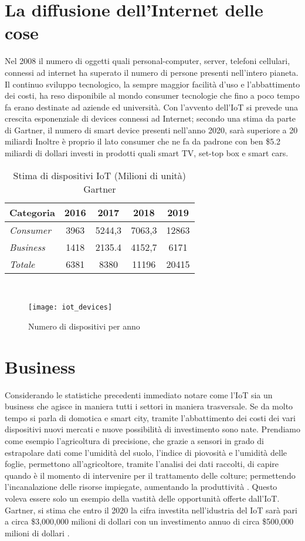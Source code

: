 \section{La diffusione dell'Internet delle cose}
Nel 2008 il numero di oggetti quali personal-computer, server, telefoni cellulari,
connessi ad internet ha superato il numero di persone presenti nell'intero
pianeta. Il continuo sviluppo tecnologico, la sempre maggior facilità d'uso e
l'abbattimento dei costi, ha reso disponibile al mondo consumer tecnologie che
fino a poco tempo fa erano destinate ad aziende ed università. 
Con l'avvento dell'IoT si prevede una crescita esponenziale di devices connessi
ad Internet;  secondo  una stima da parte di Gartner, il numero di smart
device presenti nell'anno 2020, sarà superiore a 20 miliardi \cite{gartner2016}
Inoltre è proprio il lato consumer che ne fa da padrone con ben \$5.2 miliardi
di dollari investi in prodotti quali smart TV, set-top box e smart cars.
\\
\begin{table}[h]
        \centering
        \begin{tabular}{l|c|c|c|c}
                \textbf{Categoria}  & 2016 & 2017 & 2018 & 2019 \\
                \hline
                \emph{Consumer}  & 3963 & 5244,3 & 7063,3 & 12863 \\
                \emph{Business}  & 1418 & 2135.4 & 4152,7 & 6171  \\
                \emph{Totale }   & 6381 & 8380   & 11196  & 20415 \\
        \end{tabular}
        \caption{Stima di dispositivi IoT (Milioni di unità)
        Gartner\cite{gartner2016}}
\end{table}
\\
\begin{figure}[h]
        \centering 
                \texttt{[image: iot\_devices]}
        \caption{Numero di dispositivi per anno}
\end{figure}
\section{Business}
Considerando le statistiche precedenti immediato notare come l'IoT sia un
business che agisce in maniera tutti i settori in maniera trasversale.
Se da molto tempo si parla di domotica e smart city, tramite l'abbattimento dei
costi dei vari dispositivi nuovi mercati e nuove possibilità di investimento
sono nate. Prendiamo come esempio l'agricoltura di precisione, che grazie a
sensori in grado di estrapolare dati come l'umidità del suolo, l'indice di
piovosità e l'umidità delle foglie, 
permettono all'agricoltore, tramite l'analisi dei dati raccolti, di capire
quando è il momento di intervenire per il trattamento delle colture; permettendo
l'incanalazione delle risorse impiegate, aumentando la produttività . 
Questo voleva essere solo un esempio della vastità delle opportunità  offerte
dall'IoT. Gartner, si stima che entro il 2020 la cifra
investita nell'idustria del IoT sarà pari a circa \$3,000,000 milioni di dollari
con un investimento annuo di circa \$500,000 milioni di dollari
\cite{gartner2016}. 



